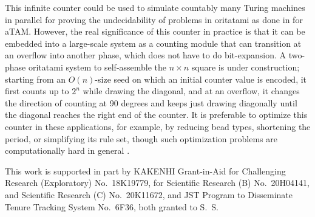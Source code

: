 \documentclass[twocolumn]{svjour3}
\begin{document}
This infinite counter could be used to simulate countably many Turing machines in parallel for proving the undecidability of problems in oritatami as done in \cite{BrChDoKaSe2013,LathropLPS2011} for aTAM. 
However, the real significance of this counter in practice is that it can be embedded into a large-scale system as a counting module that can transition at an overflow into another phase, which does not have to do bit-expansion. 
A two-phase oritatami system to self-assemble the $n \times n$ square is under construction; starting from an $O(n)$-size seed on which an initial counter value is encoded, it first counts up to $2^n$ while drawing the diagonal, and at an overflow, it changes the direction of counting at 90 degrees and keeps just drawing diagonally until the diagonal reaches the right end of the counter. 
It is preferable to optimize this counter in these applications, for example, by reducing bead types, shortening the period, or simplifying its rule set, though such optimization problems are computationally hard in general \cite{HanKim2019,OtaSeki2017}.

\begin{acknowledgements}
This work is supported in part by 
KAKENHI Grant-in-Aid for Challenging Research (Exploratory) No.~18K19779, for  Scientific Research (B) No.~20H04141, and Scientific Research (C) No.~20K11672, and JST Program to Disseminate Tenure Tracking System No.~6F36, both granted to S.~S.
\end{acknowledgements}
\end{document}
